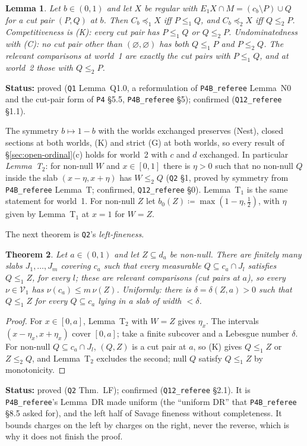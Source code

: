 \documentclass[11pt]{article}
\newtheorem{theorem}{Theorem}[section]
\newtheorem{lemma}[theorem]{Lemma}
\theoremstyle{definition}
\theoremstyle{remark}
\newcommand{\src}[1]{\texttt{#1}}
\newcommand{\status}[1]{\par\smallskip\noindent\textbf{Status:} #1\par\smallskip}
\begin{document}
\begin{lemma}\label{lem:cutform}
Let $b\in(0,1)$ and let $X$ be regular with $E_1X\cap M=(c_b\setminus P)\cup Q$ for a cut pair $(P,Q)$ at $b$. Then $C_b\preceq_1X$ iff $P\le_1Q$, and $C_b\preceq_2X$ iff $Q\le_2P$. Competitiveness is (K): every cut pair has $P\le_1Q$ or $Q\le_2P$. Undominatedness with (C): no cut pair other than $(\varnothing,\varnothing)$ has both $Q\le_1P$ and $P\le_2Q$. The relevant comparisons at world~1 are exactly the cut pairs with $P\le_1Q$, and at world~2 those with $Q\le_2P$.
\end{lemma}
\status{proved (\src{Q1} Lemma~Q1.0, a reformulation of \src{P4B\_referee} Lemma~N0 and the cut-pair form of \src{P4} \S5.5, \src{P4B\_referee} \S5); confirmed (\src{Q12\_referee} \S1.1).}

The symmetry $b\mapsto1-b$ with the worlds exchanged preserves (Nest), closed sections at both worlds, (K) and strict (G) at both worlds, so every result of \S\ref{sec:open-ordinal}(c) holds for world~2 with $c$ and $d$ exchanged. In particular \emph{Lemma~T$_2$}: for non-null $W$ and $x\in[0,1]$ there is $\eta>0$ such that no non-null $Q$ inside the slab $(x-\eta,x+\eta)$ has $W\le_2Q$ (\src{Q2} \S1, proved by symmetry from \src{P4B\_referee} Lemma~T; confirmed, \src{Q12\_referee} \S0). Lemma~T$_1$ is the same statement for world~1. For non-null $Z$ let $b_0(Z)\coloneqq\max(1-\eta,\tfrac12)$, with $\eta$ given by Lemma~T$_1$ at $x=1$ for $W=Z$.

The next theorem is \src{Q2}'s \emph{left-fineness}.

\begin{theorem}\label{thm:LF}
Let $a\in(0,1)$ and let $Z\subseteq d_a$ be non-null. There are finitely many slabs $J_1,\dots,J_m$ covering $c_a$ such that every measurable $Q\subseteq c_a\cap J_l$ satisfies $Q\le_1Z$, for every $l$; these are relevant comparisons (cut pairs at $a$), so every $\nu\in\mathcal V_1$ has $\nu(c_a)\le m\,\nu(Z)$. Uniformly: there is $\delta=\delta(Z,a)>0$ such that $Q\le_1Z$ for every $Q\subseteq c_a$ lying in a slab of width $<\delta$.
\end{theorem}
\begin{proof}
For $x\in[0,a]$, Lemma~T$_2$ with $W=Z$ gives $\eta_x$. The intervals $(x-\eta_x,x+\eta_x)$ cover $[0,a]$; take a finite subcover and a Lebesgue number $\delta$. For non-null $Q\subseteq c_a\cap J_l$, $(Q,Z)$ is a cut pair at $a$, so (K) gives $Q\le_1Z$ or $Z\le_2Q$, and Lemma~T$_2$ excludes the second; null $Q$ satisfy $Q\le_1Z$ by monotonicity.
\end{proof}
\status{proved (\src{Q2} Thm.~LF); confirmed (\src{Q12\_referee} \S2.1). It is \src{P4B\_referee}'s Lemma~DR made uniform (the ``uniform DR'' that \src{P4B\_referee} \S8.5 asked for), and the left half of Savage fineness without completeness. It bounds charges on the left by charges on the right, never the reverse, which is why it does not finish the proof.}
\end{document}

